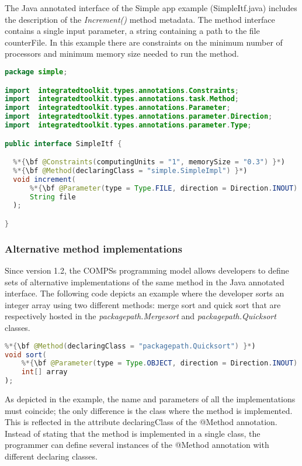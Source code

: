     
The Java annotated interface of the Simple app example (SimpleItf.java) includes the description of the {\it Increment()} method metadata.
The method interface contains a single input parameter, a string containing a path to the file counterFile. In this example
there are constraints on the minimum number of processors and minimum memory size needed to run the
method.

\begin{lstlisting}[language=java]
package simple;

import  integratedtoolkit.types.annotations.Constraints;
import  integratedtoolkit.types.annotations.task.Method;
import  integratedtoolkit.types.annotations.Parameter;
import  integratedtoolkit.types.annotations.parameter.Direction;
import  integratedtoolkit.types.annotations.parameter.Type;

public interface SimpleItf {

  %*{\bf @Constraints(computingUnits = "1", memorySize = "0.3") }*)
  %*{\bf @Method(declaringClass = "simple.SimpleImpl") }*)
  void increment(
      %*{\bf @Parameter(type = Type.FILE, direction = Direction.INOUT) }*)
      String file
  );

}
\end{lstlisting}


\subsubsection{Alternative method implementations}
Since version 1.2, the COMPSs programming model allows developers to define sets of alternative implementations of the same method in 
the Java annotated interface. 
The following code depicts an example where the developer sorts an integer array using two different
methods: merge sort and quick sort that are respectively hosted in the {\it packagepath.Mergesort} and
{\it packagepath.Quicksort} classes.

\begin{lstlisting}[language=java]
%*{\bf @Method(declaringClass = "packagepath.Mergesort") }*)
%*{\bf @Method(declaringClass = "packagepath.Quicksort") }*)                       
void sort(
    %*{\bf @Parameter(type = Type.OBJECT, direction = Direction.INOUT) }*)
    int[] array
);
\end{lstlisting}

As depicted in the example, the name and parameters of all the implementations must coincide; the only
difference is the class where the method is implemented. This is reflected in the attribute declaringClass of
the @Method annotation. Instead of stating that the method is implemented in a single class, the
programmer can define several instances of the @Method annotation with different declaring classes.

